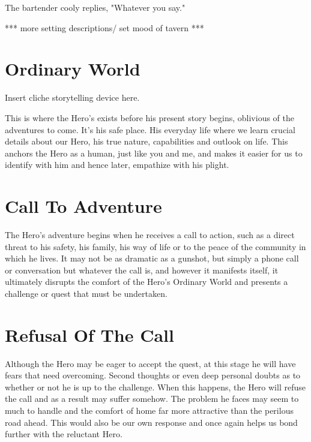 \documentclass[oneside]{book}
\begin{document}
The bartender cooly replies, "Whatever you say."



*** more setting descriptions/ set mood of tavern *** 



\newpage

\chapter{Ordinary World}

Insert cliche storytelling device here. 

This is where the Hero's exists before his present story begins, oblivious of the adventures to come. It's his safe place. His everyday life where we learn crucial details about our Hero, his true nature, capabilities and outlook on life. This anchors the Hero as a human, just like you and me, and makes it easier for us to identify with him and hence later, empathize with his plight.



\newpage

\chapter {Call To Adventure}

The Hero's adventure begins when he receives a call to action, such as a direct threat to his safety, his family, his way of life or to the peace of the community in which he lives. It may not be as dramatic as a gunshot, but simply a phone call or conversation but whatever the call is, and however it manifests itself, it ultimately disrupts the comfort of the Hero's Ordinary World and presents a challenge or quest that must be undertaken.



\newpage

\chapter{Refusal Of The Call}

Although the Hero may be eager to accept the quest, at this stage he will have fears that need overcoming. Second thoughts or even deep personal doubts as to whether or not he is up to the challenge. When this happens, the Hero will refuse the call and as a result may suffer somehow. The problem he faces may seem to much to handle and the comfort of home far more attractive than the perilous road ahead. This would also be our own response and once again helps us bond further with the reluctant Hero.
\end{document}
